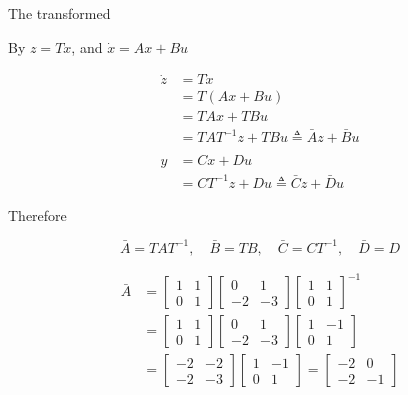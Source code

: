 \documentclass[12pt,a4paper]{article}
\begin{document}
The transformed

By $z = Tx$, and $\dot x = Ax + Bu$

\begin{align*}
	\dot z &= T \dot x	\\
	&= T (Ax + Bu) \\
	&= TAx + TBu \\
	&= TAT^{-1}z + TBu \triangleq \bar A z + \bar B u \\ \\ 
	y &= Cx + Du \\
	&= CT^{-1} z + Du \triangleq \bar C z + \bar D u
\end{align*}

Therefore

\[
\bar A = TAT^{-1}, \quad \bar B = TB,\quad \bar C = CT^{-1},\quad \bar D = D
\]

\begin{align*}
	\bar A &= \begin{bmatrix}
		1 & 1 \\ 0 & 1
	\end{bmatrix} \begin{bmatrix}
	0 & 1 \\ -2 & -3
	\end{bmatrix} \begin{bmatrix}
		1 & 1 \\ 0 & 1
	\end{bmatrix}^{-1} \\
	&= \begin{bmatrix}
		1 & 1 \\ 0 & 1
	\end{bmatrix} \begin{bmatrix}
	0 & 1 \\ -2 & -3
	\end{bmatrix} \begin{bmatrix}
	1 & -1 \\ 0 & 1
	\end{bmatrix} \\
	&= \begin{bmatrix}
		-2 & -2  \\
		-2 & -3
	\end{bmatrix} \begin{bmatrix}
	1 & -1 \\ 0 & 1
	\end{bmatrix} = \begin{bmatrix}
		-2  & 0 \\ -2 & -1
	\end{bmatrix}
\end{align*}
\end{document}
